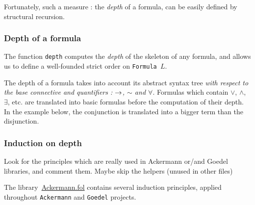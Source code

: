 Fortunately, such a measure : the \emph{depth} of a formula,
can be easily defined by structural recursion.





\subsubsection{Depth of a formula}

The function \texttt{depth} computes the \emph{depth} of the 
 skeleton of any formula, and allows us to define a well-founded strict order on 
\texttt{Formula $L$}.


\begin{remark}
  The depth of a formula takes into account its abstract syntax tree \emph{with respect to the base connective and quantifiers : $\mbox{$\rightarrow$}$, $\sim$ and $\forall$}.
    Formulas which contain $\vee$, $\wedge$, $\exists$, etc. are translated into
    basic formulas before the computation of their depth. In the example below, 
the conjunction is translated into a bigger term than the disjunction.


\end{remark}

\subsubsection{Induction on depth}








\begin{todo}
 Look for the principles which are really used in Ackermann or/and Goedel libraries, and comment them.
 Maybe skip the helpers (unused in other files)
\end{todo}

The library~\href{../theories/html/hydras.Ackermann.fol.html}{Ackermann.fol} contains several induction principles, applied 
throughout \texttt{Ackermann} and \texttt{Goedel} projects.


